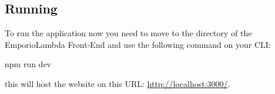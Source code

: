 \subsection{Running}
To run the application now you need to move to the directory of the EmporioLambda Front-End and use the following command on your CLI:
\begin{center}
npm run dev
\end{center}
this will host the website on this URL: \url{http://localhost:3000/}.